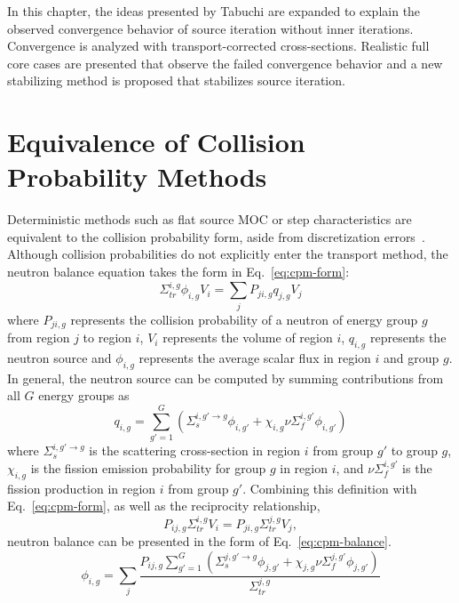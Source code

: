 In this chapter, the ideas presented by Tabuchi are expanded to explain the observed convergence behavior of source iteration without inner iterations. Convergence is analyzed with transport-corrected cross-sections. Realistic full core cases are presented that observe the failed convergence behavior and a new stabilizing method is proposed that stabilizes source iteration.

\section{Equivalence of Collision Probability Methods}
\label{sec:equiv-cpm}

Deterministic methods such as flat source \ac{MOC} or step characteristics are equivalent to the collision probability form, aside from discretization errors~\cite{ty-problem}. Although collision probabilities do not explicitly enter the transport method, the neutron balance equation takes the form in Eq.~\ref{eq:cpm-form}:
\begin{equation}
	\Sigma_{\textit{tr}}^{i, g} \phi_{i,g} V_i = \sum_j P_{ji, g} q_{j,g} V_j
	\label{eq:cpm-form}
\end{equation}
where $P_{ji,g}$ represents the collision probability of a neutron of energy group $g$ from region $j$ to region $i$, $V_i$ represents the volume of region $i$, $q_{i,g}$ represents the neutron source and $\phi_{i,g}$ represents the average scalar flux in region $i$ and group $g$. In general, the neutron source can be computed by summing contributions from all $G$ energy groups as
\begin{equation}
	q_{i,g} = \sum_{g'=1}^G \left( \Sigma_{s}^{i,g'\rightarrow g} \phi_{i,g'} + \chi_{i,g} \nu \Sigma_{f}^{i,g'} \phi_{i,g'} \right)
\end{equation}
where $\Sigma_{s}^{i, g'\rightarrow g}$ is the scattering cross-section in region $i$ from group $g'$ to group $g$, $\chi_{i,g}$ is the fission emission probability for group $g$ in region $i$, and $\nu \Sigma_{f}^{i,g'}$ is the fission production in region $i$ from group $g'$. Combining this definition with Eq.~\ref{eq:cpm-form}, as well as the reciprocity relationship, 
\begin{equation}
	P_{ij, g} \Sigma_{\textit{tr}}^{i, g} V_i = P_{ji, g} \Sigma_{\textit{tr}}^{j, g} V_j,
	\label{eq:reciprocity}
\end{equation}
neutron balance can be presented in the form of Eq.~\ref{eq:cpm-balance}.
\begin{equation}
	\phi_{i,g} = \sum_j \frac{P_{ij, g} \sum_{g'=1}^G \left( \Sigma_{s}^{j, g'\rightarrow g} \phi_{j,g'} + \chi_{j,g} \nu \Sigma_{f}^{j,g'} \phi_{j,g'} \right)}{\Sigma_{\textit{tr}}^{j, g}} 
	\label{eq:cpm-balance}
\end{equation}
